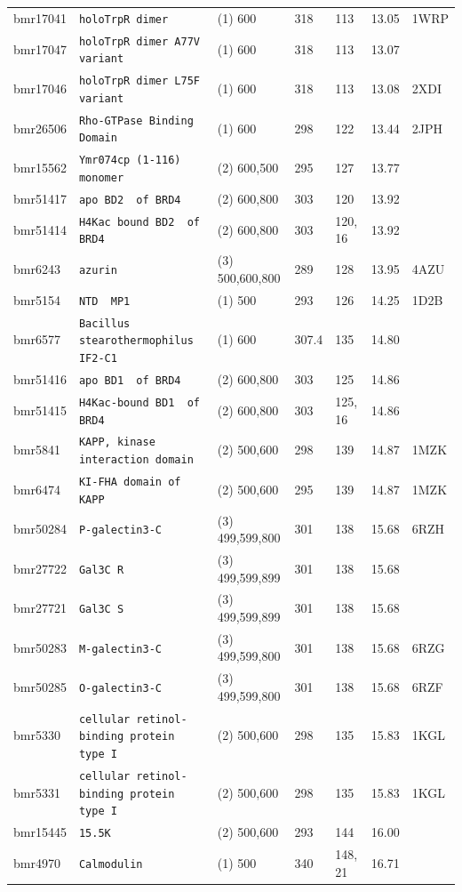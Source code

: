 \documentclass[showkeys,aps,prb,prepreint,amssymb, amsmath,nobibnotes]{article}
\begin{document}
\begin{tiny}
\begin{tabular}{lllllll}
bmr17041 & \verb|holoTrpR dimer| & (1) 600& 318&  113& 13.05& 1WRP\\
bmr17047 & \verb|holoTrpR dimer A77V variant| & (1) 600& 318&  113& 13.07& \\
bmr17046 & \verb|holoTrpR dimer L75F variant| & (1) 600& 318&  113& 13.08& 2XDI\\
bmr26506 & \verb|Rho-GTPase Binding Domain| & (1) 600& 298&  122& 13.44& 2JPH\\
bmr15562 & \verb|Ymr074cp (1-116) monomer| & (2) 600,500& 295&  127& 13.77& \\
bmr51417 & \verb|apo BD2  of BRD4| & (2) 600,800& 303&  120& 13.92& \\
bmr51414 & \verb|H4Kac bound BD2  of BRD4| & (2) 600,800& 303&  120, 16& 13.92& \\
bmr6243 & \verb|azurin| & (3) 500,600,800& 289&  128& 13.95& 4AZU\\
bmr5154 & \verb|NTD  MP1| & (1) 500& 293&  126& 14.25& 1D2B\\
bmr6577 & \verb|Bacillus stearothermophilus IF2-C1| & (1) 600& 307.4&  135& 14.80& \\
bmr51416 & \verb|apo BD1  of BRD4| & (2) 600,800& 303&  125& 14.86& \\
bmr51415 & \verb|H4Kac-bound BD1  of BRD4| & (2) 600,800& 303&  125, 16& 14.86& \\
bmr5841 & \verb|KAPP, kinase interaction domain| & (2) 500,600& 298&  139& 14.87& 1MZK\\
bmr6474 & \verb|KI-FHA domain of KAPP| & (2) 500,600& 295&  139& 14.87& 1MZK\\
bmr50284 & \verb|P-galectin3-C| & (3) 499,599,800& 301&  138& 15.68& 6RZH\\
bmr27722 & \verb|Gal3C R| & (3) 499,599,899& 301&  138& 15.68& \\
bmr27721 & \verb|Gal3C S| & (3) 499,599,899& 301&  138& 15.68& \\
bmr50283 & \verb|M-galectin3-C| & (3) 499,599,800& 301&  138& 15.68& 6RZG\\
bmr50285 & \verb|O-galectin3-C| & (3) 499,599,800& 301&  138& 15.68& 6RZF\\
bmr5330 & \verb|cellular retinol-binding protein type I| & (2) 500,600& 298&  135& 15.83& 1KGL\\
bmr5331 & \verb|cellular retinol-binding protein type I| & (2) 500,600& 298&  135& 15.83& 1KGL\\
bmr15445 & \verb|15.5K| & (2) 500,600& 293&  144& 16.00& \\
bmr4970 & \verb|Calmodulin| & (1) 500& 340&  148, 21& 16.71& \\

\end{tabular}
\end{tiny}
\end{document}
